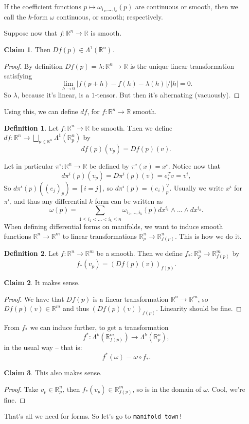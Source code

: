 \documentclass{article}
\theoremstyle{definition}
\newtheorem{defi}{Definition}
\newtheorem{claim}{Claim}
\begin{document}
If the coefficient functions $p\mapsto\omega_{i_1,\dots,i_k}(p)$ are continuous or smooth, then we call the $k$-form $\omega$ continuous, or smooth; respectively.

Suppose now that $f:\mathbb{R}^n\to\mathbb{R}$ is smooth.
\begin{claim}
  Then $Df(p)\in\Lambda^1(\mathbb{R}^n)$.
\end{claim}
\begin{proof}
  By definition $Df(p)=\lambda:\mathbb{R}^n\to\mathbb{R}$ is the unique linear transformation satisfying
  \[\lim_{h\to 0}|f(p+h)-f(h)-\lambda(h)|/|h|=0.\]
  So $\lambda$, because it's linear, is a $1$-tensor. But then it's alternating (vacuously).
\end{proof}
Using this, we can define $df$, for $f:\mathbb{R}^n\to\mathbb{R}$ smooth.
\begin{defi}
  Let $f:\mathbb{R}^n\to\mathbb{R}$ be smooth. Then we define $df:\mathbb{R}^n\to\bigsqcup_{p\in\mathbb{R}^n}\Lambda^1(\mathbb{R}^n_p)$ by
  \[df(p)(v_p)=Df(p)(v).\]
\end{defi}
Let in particular $\pi^i:\mathbb{R}^n\to\mathbb{R}$ be defined by $\pi^i(x)=x^i$. Notice now that
\[d\pi^i(p)(v_p)=D\pi^i(p)(v)=e_i^Tv=v^i,\]
So $d\pi^i(p)((e_j)_p)=[i=j]$, so $d\pi^i(p)=(e_i)_p^\vee$. Usually we write $x^i$ for $\pi^i$, and thus any differential $k$-form can be written as
\[\omega(p)=\sum_{1\leq i_1<\dots<i_k\leq n}\omega_{i_1,\dots,i_k}(p)dx^{i_1}\land\dots\land dx^{i_k}.\]
When defining differential forms on manifolds, we want to induce smooth functions $\mathbb{R}^n\to\mathbb{R}^m$ to linear transformations $\mathbb{R}^n_p\to\mathbb{R}^n_{f(p)}$. This is how we do it.
\begin{defi}
  Let $f:\mathbb{R}^n\to\mathbb{R}^m$ be a smooth. Then we define $f_\ast:\mathbb{R}^n_p\to\mathbb{R}^m_{f(p)}$ by
  \[f_\ast(v_p)=(Df(p)(v))_{f(p)}.\]
\end{defi}
\begin{claim}
  It makes sense.
\end{claim}
\begin{proof}
  We have that $Df(p)$ is a linear transformation $\mathbb{R}^n\to\mathbb{R}^m$, so $Df(p)(v)\in\mathbb{R}^m$ and thus $(Df(p)(v))_{f(p)}$. Linearity should be fine.
\end{proof}
From $f_\ast$ we can induce further, to get a transformation
\[f^\ast:\Lambda^k(\mathbb{R}^m_{f(p)})\to\Lambda^k(\mathbb{R}^n_p),\]
in the usual way -- that is:
\[f^\ast(\omega)=\omega\circ f_\ast.\]
\begin{claim}
  This also makes sense.
\end{claim}
\begin{proof}
  Take $v_p\in\mathbb{R}^n_p$, then $f_\ast(v_p)\in\mathbb{R}^m_{f(p)}$, so is in the domain of $\omega$. Cool, we're fine.
\end{proof}
That's all we need for forms. So let's go to {\Huge\tt manifold town!}
\end{document}
